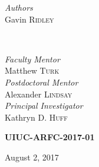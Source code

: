 \begin{titlepage}
    
    \begin{minipage}{0.4\textwidth}
        \begin{flushleft}
            \large
            \textit{Authors}\\
            Gavin \textsc{Ridley}\\
        \end{flushleft}
    \end{minipage}
    ~
    \begin{minipage}{0.4\textwidth}
        \begin{flushright}
            \large
            \textit{Faculty Mentor}\\
            Matthew \textsc{Turk}\\
            \textit{Postdoctoral Mentor}\\
            Alexander \textsc{Lindsay}\\ 
            \textit{Principal Investigator}\\
            Kathryn D. \textsc{Huff}%
        \end{flushright}
    \end{minipage}
    

    \vspace{1cm}
    \textsc{\LARGE\bfseries UIUC-ARFC-2017-01} %
    \vspace{0.5cm}
    
    
    \vspace{0.5cm} %
    {\large August 2, 2017} %
    \vspace{0.5cm}

    

\end{titlepage}
